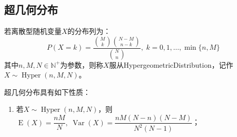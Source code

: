\subsection{超几何分布}
\begin{definition}
	若离散型随机变量$X$的分布列为：
	\begin{equation*}
		P(X=k)=\frac{\binom{M}{k}\binom{N-M}{n-k}}{\binom{N}{n}},\;k=0,1,\dots,\min\{n,M\}
	\end{equation*}
	其中$n,M,N\in\mathbb{N}^+$为参数，则称$X$服从\gls{HypergeometricDistribution}，记作$X\sim\operatorname{Hyper}(n,M,N)$。
\end{definition}
\begin{property}
	超几何分布具有如下性质：
	\begin{enumerate}
		\item 若$X\sim\operatorname{Hyper}(n,M,N)$，则$\operatorname{E}(X)=\dfrac{nM}{N},\;\operatorname{Var}(X)=\dfrac{nM(N-n)(N-M)}{N^2(N-1)}$；
	\end{enumerate}
\end{property}
